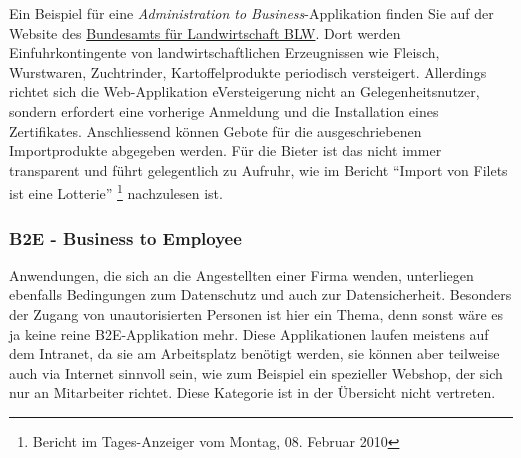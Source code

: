 Ein Beispiel für eine \emph{Administration to Business}-Applikation finden Sie
auf der Website des
\href{https://www.blw.admin.ch/blw/de/home.html}{Bundesamts für Landwirtschaft BLW}.
Dort werden Einfuhrkontingente von landwirtschaftlichen Erzeugnissen wie Fleisch,
Wurstwaren, Zuchtrinder, Kartoffelprodukte periodisch versteigert. Allerdings
richtet sich die Web-Applikation eVersteigerung nicht an Gelegenheitsnutzer,
sondern erfordert eine vorherige Anmeldung und die Installation eines Zertifikates.
Anschliessend können Gebote für die ausgeschriebenen Importprodukte abgegeben
werden. Für die Bieter ist das nicht immer transparent und führt gelegentlich
zu Aufruhr, wie im Bericht ``Import von Filets ist eine Lotterie''
\footnote{Bericht im Tages-Anzeiger vom Montag, 08. Februar 2010} nachzulesen ist.

\subsubsection*{B2E - Business to Employee}

Anwendungen, die sich an die Angestellten einer Firma wenden, unterliegen
ebenfalls Bedingungen zum Datenschutz und auch zur Datensicherheit.
Besonders der Zugang von unautorisierten Personen ist hier ein Thema, denn
sonst wäre es ja keine reine B2E-Applikation mehr. Diese Applikationen
laufen meistens auf dem Intranet, da sie am Arbeitsplatz benötigt werden,
sie können aber teilweise auch via Internet sinnvoll sein, wie zum Beispiel
ein spezieller Webshop, der sich nur an Mitarbeiter richtet. Diese Kategorie
ist in der Übersicht nicht vertreten.

